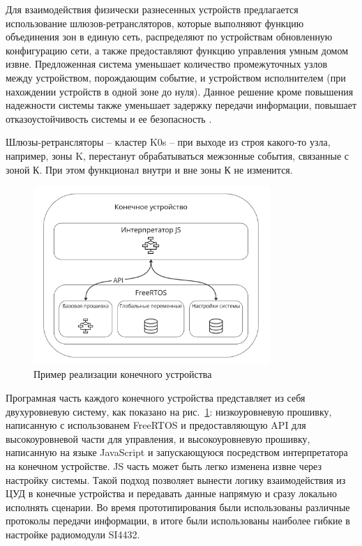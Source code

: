 \documentclass[a4paper,12pt]{article}
\begin{document}
Для взаимодействия физически разнесенных устройств предлагается использование
шлюзов-ретрансляторов, которые выполняют функцию объединения зон в единую сеть,
распределяют по устройствам обновленную конфигурацию сети, а также предоставляют функцию управления умным домом извне.
Предложенная система уменьшает количество промежуточных узлов между устройством, порождающим событие, и устройством
исполнителем (при нахождении устройств в одной зоне до нуля). Данное решение кроме повышения надежности системы также
уменьшает задержку передачи информации, повышает отказоустойчивость системы и ее безопасность \cite{SecuritySmartHome, SecuritySmartHome2}.


Шлюзы-ретрансляторы -- кластер K0s -- при выходе из строя какого-то узла, например, зоны
K, перестанут обрабатываться межзонные события, связанные с зоной К. При этом функционал внутри и вне зоны
К не изменится.

\begin{figure}[h]
    \centering
    \includegraphics[width=0.8\textwidth]{images/Fig05.png}
    \caption{Пример реализации конечного устройства}
    \label{fig:end_device}
\end{figure}

Програмная часть каждого конечного устройства представляет из себя двухуровневую систему, как показано на рис.~\ref{fig:end_device}:
низкоуровневую прошивку, написанную с использованем FreeRTOS и предоставляющую API для высокоуровневой части для
управления, и высокоуровневую прошивку, написанную на языке JavaScript и запускающуюся посредством интерпретатора на
конечном устройстве. JS часть может быть легко изменена извне через настройку системы. Такой подход
позволяет вынести логику взаимодействия из ЦУД в конечные устройства и передавать данные напрямую и сразу локально
исполнять сценарии. Во время прототипирования были использованы различные протоколы передачи информации, в итоге
были использованы наиболее гибкие в настройке радиомодули SI4432.
\end{document}

